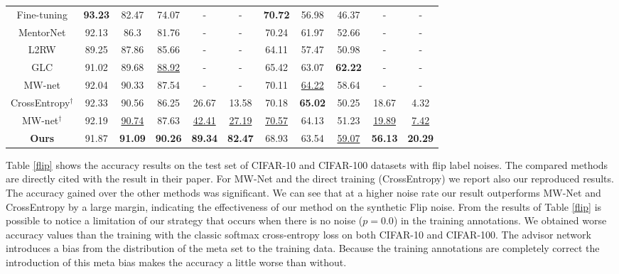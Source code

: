 \documentclass[runningheads]{llncs}
\begin{document}
\begin{table}[!ht]
{\begin{tabular}{c|c|c|c|c|c||c|c|c|c|c}
				Fine-tuning \cite{shu2019meta} & \textbf{93.23} & 82.47          & 74.07          & -              & -              & \textbf{70.72} & 56.98          & 46.37          & -              & -              \\ 
				MentorNet \cite{jiang2018mentornet}   & 92.13 & 86.3           & 81.76          & -              & -              & 70.24 & 61.97          & 52.66          & -              & -              \\ 
				L2RW \cite{ren2018learning}        & 89.25 & 87.86          & 85.66          & -              & -              & 64.11 & 57.47          & 50.98          & -              & -              \\ 
				GLC \cite{hendrycks2018using}        & 91.02 & 89.68          & \underline{88.92}          & -              & -              & 65.42 & 63.07          & \textbf{62.22} & -              & -              \\ 
				MW-net \cite{shu2019meta}     & 92.04 & 90.33          & 87.54          & -              & -              & 70.11 & \underline{64.22}          & 58.64          & -              & -              \\ 
				CrossEntropy$^\dagger$     &   92.33    & 90.56          & 86.25          & 26.67          & 13.58          & 70.18       & \textbf{65.02} & 50.25          & 18.67          & 4.32           \\ 
				MW-net$^\dagger$ \cite{shu2019meta}     &  92.19     & \underline{90.74}          & 87.63          & \underline{42.41}          & \underline{27.19}          & \underline{70.57}      & 64.13          & 51.23          & \underline{19.89}          & \underline{7.42}           \\  \hline
				\textbf{Ours}        &  91.87     & \textbf{91.09} & \textbf{90.26} & \textbf{89.34} & \textbf{82.47} & 68.93      & 63.54          & \underline{59.07}          & \textbf{56.13} & \textbf{20.29} \\ \hline
			\end{tabular}
		}
	\end{table}
	
	Table \ref{flip} shows the accuracy results on the test set of CIFAR-10 and CIFAR-100 datasets with flip label noises. The compared methods are directly cited with the result in their paper. For MW-Net \cite{shu2019meta} and the direct training (CrossEntropy) we report also our reproduced results. The accuracy gained over the other methods was significant. We can see that at a higher noise rate our result outperforms MW-Net and CrossEntropy by a large margin, indicating the effectiveness of our method on the synthetic Flip noise.  From the results of Table \ref{flip} is possible to notice a limitation of our strategy that occurs when there is no noise ($p = 0.0$) in the training annotations. We obtained worse accuracy values than the training with the classic softmax cross-entropy loss on both CIFAR-10 and CIFAR-100. The advisor network introduces a bias from the distribution of the meta set to the training data. Because the training annotations are completely correct the introduction of this meta bias makes the accuracy a little worse than without.
	
\end{document}
